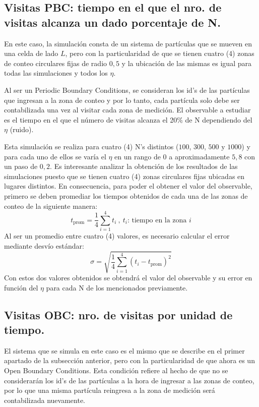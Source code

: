 \documentclass[11pt]{article}
\begin{document}
        \subsection{Visitas PBC: tiempo en el que el nro. de visitas alcanza un dado porcentaje de N.}
            En este caso, la simulación consta de un sistema de partículas que se mueven en una celda de lado $L$,
            pero con la particularidad de que se tienen cuatro (4) zonas de conteo circulares fijas de radio $0,5$ y la
            ubicación de las mismas es igual para todas las simulaciones y todos los $\eta$.

            Al ser un Periodic Boundary Conditions, se consideran los id's de las partículas que ingresan a la zona de
            conteo y por lo tanto, cada partícula solo debe ser contabilizada una vez al visitar cada zona de medición.
            El observable a estudiar es el tiempo en el que el número de visitas alcanza el 20\% de N dependiendo
            del $\eta$ (ruido).

            Esta simulación se realiza para cuatro (4) N's distintos ($100$, $300$, $500$ y $1000$) y para cada uno de ellos
            se varía el $\eta$ en un rango de $0$ a aproximadamente $5,8$ con un paso de $0,2$. Es interesante analizar la
            obtención de los resultados de las simulaciones puesto que se tienen cuatro (4) zonas circulares fijas ubicadas en lugares
            distintos. En consecuencia, para poder el obtener el valor del observable, primero se deben promediar los tiempos obtenidos
            de cada una de las zonas de conteo de la siguiente manera:
            \begin{equation}
                t_{\text{prom}} = \frac{1}{4} \sum_{i=1}^{4} t_i \ ,\ t_i\text{: tiempo en la zona }i
            \end{equation}
            Al ser un promedio entre cuatro (4) valores, es necesario calcular el error mediante desvío estándar:
            \begin{equation}
                \sigma = \sqrt{\frac{1}{4} \sum_{i=1}^{4} (t_i - t_{\text{prom}})^2}
            \end{equation}
            Con estos dos valores obtenidos se obtendrá el valor del observable y su error en función del $\eta$ para cada N de los mencionados previamente.


    \subsection{Visitas OBC: nro. de visitas por unidad de tiempo.}
            El sistema que se simula en este caso es el mismo que se describe en el primer apartado de la subsección
            anterior, pero con la particularidad de que ahora es un Open Boundary Conditions. Esta condición refiere
            al hecho de que no se considerarán los id's de las partículas a la hora de ingresar a las zonas de conteo,
            por lo que una misma partícula reingresa a la zona de medición será contabilizada nuevamente.
\end{document}
